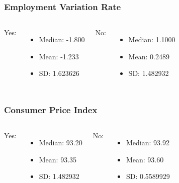 \documentclass{beamer}
\begin{document}
\begin{frame}
	\frametitle{Employment Variation Rate}
	\begin{columns}[c] %
		
    Yes:
		\begin{itemize}
			\item Median: -1.800
			\item Mean: -1.233
      \item SD: 1.623626
		\end{itemize}
		
    No:
		\begin{itemize}
			\item Median: 1.1000
			\item Mean: 0.2489
      \item SD: 1.482932
		\end{itemize}
		
	\end{columns}
\end{frame}

\begin{frame}
	\frametitle{Consumer Price Index}
	\begin{columns}[c] %
		
    Yes:
		\begin{itemize}
			\item Median: 93.20
			\item Mean: 93.35 
      \item SD: 1.482932
		\end{itemize}
		
    No:
		\begin{itemize}
			\item Median: 93.92
			\item Mean: 93.60
      \item SD: 0.5589929
		\end{itemize}
		
	\end{columns}
\end{frame}
\end{document}
